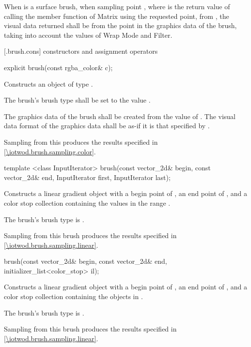 \pnum
When  is a surface brush, when sampling point , where  is the return value of calling the  member function of Matrix using the requested point, from , the visual data returned shall be from the point  in the graphics data of the brush, taking into account the values of Wrap Mode and Filter.

 [\iotwod.brush.cons] { constructors and assignment operators}

%
\begin{itemdecl}
explicit brush(const rgba_color& c);
\end{itemdecl}
\begin{itemdescr}
\pnum
\effects
Constructs an object of type .

\pnum
The brush's brush type shall be set to the value .

\pnum
The graphics data of the brush shall be created from the value of . The visual data format of the graphics data shall be as-if it is that specified by .

\pnum
\remarks
Sampling from this produces the results specified in \ref{\iotwod.brush.sampling.color}.
\end{itemdescr}

%
\begin{itemdecl}
template <class InputIterator>
brush(const vector_2d& begin, const vector_2d& end,
  InputIterator first, InputIterator last);
\end{itemdecl}
\begin{itemdescr}
\pnum
\effects
Constructs a linear gradient  object with a begin point of , an end point of , and a color stop collection containing the values in the range .

\pnum
The brush's brush type is .

\pnum
\remarks
Sampling from this brush produces the results specified in \ref{\iotwod.brush.sampling.linear}.
\end{itemdescr}

%
\begin{itemdecl}
brush(const vector_2d& begin, const vector_2d& end,
  initializer_list<color_stop> il);
\end{itemdecl}
\begin{itemdescr}
\pnum
\effects
Constructs a linear gradient  object with a begin point of , an end point of , and a color stop collection containing the  objects in .

\pnum
The brush's brush type is .

\pnum
\remarks
Sampling from this brush produces the results specified in \ref{\iotwod.brush.sampling.linear}.
\end{itemdescr}

